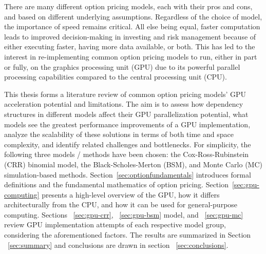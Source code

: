\documentclass[english,12pt,a4paper,pdftex,sci,utf8]{aaltothesis}
\begin{document}
There are many different option pricing models, each with their pros and cons, and based on different underlying assumptions. Regardless of the choice of model, the importance of speed remains critical. All else being equal, faster computation leads to improved decision-making in investing and risk management because of either executing faster, having more data available, or both. This has led to the interest in re-implementing common option pricing models to run, either in part or fully, on the graphics processing unit (GPU) due to its powerful parallel processing capabilities compared to the central processing unit (CPU).

This thesis forms a literature review of common option pricing models' GPU acceleration potential and limitations. The aim is to assess how dependency structures in different models affect their GPU parallelization potential, what models see the greatest performance improvements of a GPU implementation, analyze the scalability of these solutions in terms of both time and space complexity, and identify related challenges and bottlenecks. For simplicity, the following three models / methods have been chosen: the Cox-Ross-Rubinstein (CRR) binomial model, the Black-Scholes-Merton (BSM), and Monte Carlo (MC) simulation-based methods. Section~\ref{sec:optionfundamentals} introduces formal definitions and the fundamental mathematics of option pricing. Section~\ref{sec:gpu-computing} presents a high-level overview of the GPU, how it differs architecturally from the CPU, and how it can be used for general-purpose computing. Sections ~\ref{sec:gpu-crr}, ~\ref{sec:gpu-bsm} model, and ~\ref{sec:gpu-mc} review GPU implementation attempts of each respective model group, considering the aforementioned factors. The results are summarized in Section ~\ref{sec:summary} and conclusions are drawn in section ~\ref{sec:conclusions}.
\end{document}
